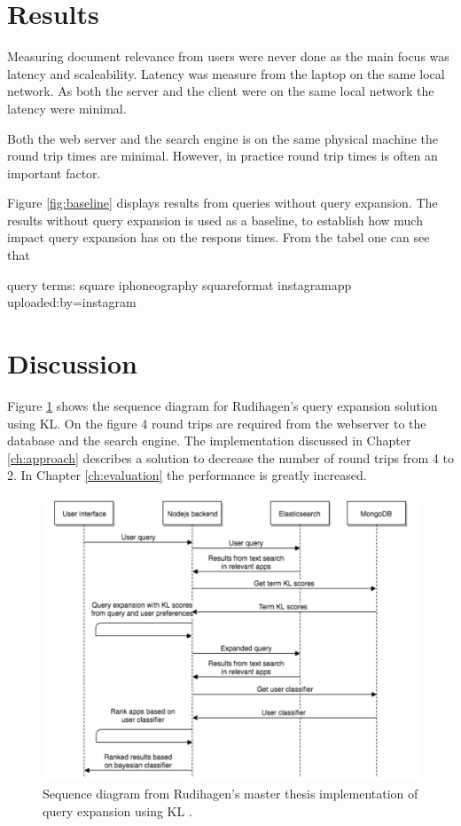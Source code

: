 \section{Results}
Measuring document relevance from users were never done as the main focus was latency and scaleability.
Latency was measure from the laptop on the same local network.
As both the server and the client were on the same local network the latency were minimal.

Both the web server and the search engine is on the same physical machine the round trip times are minimal.
However, in practice round trip times is often an important factor.

Figure \ref{fig:baseline} displays results from queries without query expansion.
The results without query expansion is used as a baseline,
to establish how much impact query expansion has on the respons times.
From the tabel one can see that

query terms: square iphoneography squareformat instagramapp uploaded:by=instagram



\section{Discussion}
Figure \ref{fig:sequence-diagram-search-master} shows the sequence diagram for Rudihagen's query expansion solution using KL.
On the figure 4 round trips are required from the webserver to the database and the search engine.
The implementation discussed in Chapter \ref{ch:approach} describes a solution to decrease the number of round trips from 4 to 2.
In Chapter \ref{ch:evaluation} the performance is greatly increased.

\begin{figure}[h!]
\centering \includegraphics[width=0.9\linewidth]{img/sequence-diagram-search-master-thesis.png}
\caption{Sequence diagram from Rudihagen's master thesis implementation of query expansion using KL \cite[p. 37]{master-thesis}.}
\label{fig:sequence-diagram-search-master}
\end{figure}

